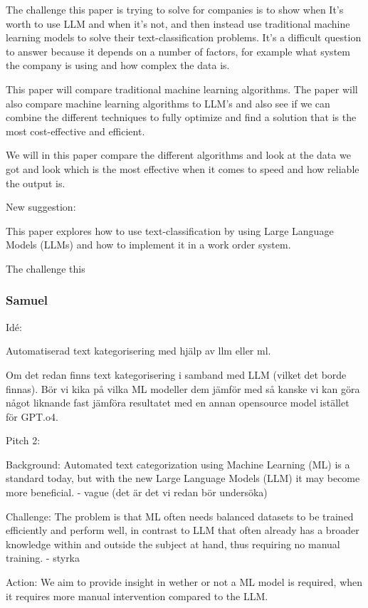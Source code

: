 \documentclass{article}
\begin{document}
The challenge this paper is trying to solve for companies is to show when It's worth to use LLM and when it's not, and
then instead use traditional machine learning models to solve their text-classification problems. It's a difficult question to answer
because it depends on a number of factors, for example what system the company is using and how complex the data is.

This paper will compare traditional machine learning algorithms. The paper will also compare machine learning algorithms
to LLM's and also see if we can combine the different techniques to fully optimize and find a solution that is the most cost-effective
and efficient.

We will in this paper compare the different algorithms and look at the data we got and look which is the most effective when it comes to speed
and how reliable the output is.


New suggestion:

This paper explores how to use text-classification by using Large Language Models (LLMs) and how to implement it in a work order system.

The challenge this

\subsubsection{Samuel}

Idé:

Automatiserad text kategorisering med hjälp av llm eller ml.

Om det redan finns text kategorisering i samband med LLM (vilket det borde finnas).
Bör vi kika på vilka ML modeller dem jämför med så kanske vi kan göra något liknande fast jämföra
resultatet med en annan opensource model istället för GPT.o4.

Pitch 2:

Background:
Automated text categorization using Machine Learning (ML) is a standard today, but with the new
Large Language Models (LLM) it may become more beneficial. - vague (det är det vi redan bör undersöka)

Challenge:
The problem is that ML often needs balanced datasets to be trained efficiently and perform well,
in contrast to LLM that often already has a broader knowledge within and outside the subject at hand,
thus requiring no manual training. - styrka

Action:
We aim to provide insight in wether or not a ML model is required, when it requires more manual
intervention compared to the LLM.
\end{document}
